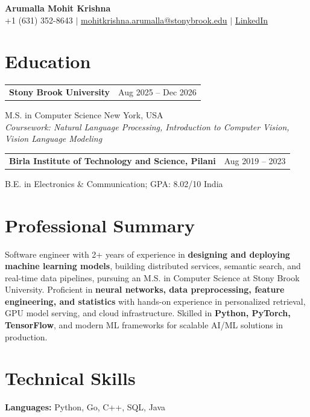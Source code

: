 \documentclass[letterpaper,10pt]{article}
\makeatletter
\newcommand{\entry}[2]{%
  \noindent
  \begin{tabularx}{\linewidth}
    {@{}>{\raggedright\arraybackslash}X@{\hspace{6pt}}r@{}}
    \textbf{#1} & #2
  \end{tabularx}\par
}
\makeatother
\begin{document}
\begin{center}
    {\LARGE\bfseries Arumalla Mohit Krishna}\\[3pt]
    +1 (631) 352-8643 $|$
    \href{mailto:mohitkrishna.arumalla@stonybrook.edu}
    {mohitkrishna.arumalla@stonybrook.edu} $|$
    \href{https://linkedin.com/in/mohit-krishna-arumalla}
    {LinkedIn}
\end{center}
\vspace{-8pt}

\section{Education}

\entry
  {\textbf{Stony Brook University}}
  {Aug 2025 -- Dec 2026}

M.S. in Computer Science \hfill New York, USA\\
\textit{
Coursework: Natural Language Processing,
Introduction to Computer Vision, Vision Language Modeling
}
\vspace{3pt}

\entry
  {\textbf{Birla Institute of Technology and Science, Pilani}}
  {Aug 2019 -- 2023}

B.E. in Electronics \& Communication; GPA: 8.02/10 \hfill India
\section{Professional Summary}

Software engineer with 2+ years of experience in \textbf{designing and deploying machine learning models}, building distributed services, semantic search, and real-time data pipelines, pursuing an M.S. in Computer Science at Stony Brook University. Proficient in \textbf{neural networks, data preprocessing, feature engineering, and statistics} with hands-on experience in personalized retrieval, GPU model serving, and cloud infrastructure. Skilled in \textbf{Python, PyTorch, TensorFlow}, and modern ML frameworks for scalable AI/ML solutions in production.

\section{Technical Skills}

\textbf{Languages:}
Python, Go, C++, SQL, Java\\
\end{document}
